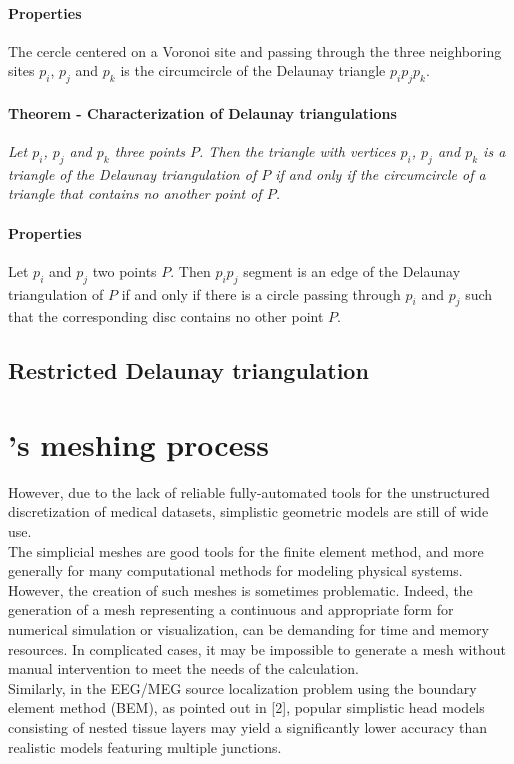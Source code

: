 \paragraph{Properties}
{
The cercle centered on a Voronoi site and passing through the three neighboring sites $p_{i}$, $p_{j}$ and $p_{k}$ is the circumcircle of the Delaunay triangle $p_{i}p_{j}p_{k}$.
}


\paragraph{Theorem - Characterization of Delaunay triangulations}
{
\it Let $p_{i}$, $p_{j}$ and $p_{k}$ three points $P$. Then the triangle with vertices $p_{i}$, $p_{j}$ and $p_{k}$ is a triangle of the Delaunay triangulation of $P$ if and only if the circumcircle of a triangle that contains no another point of $P$.
}

\paragraph{Properties}
{
Let $p_{i}$ and $p_{j}$ two points $P$. Then $p_{i}p_{j}$ segment is an edge of the Delaunay triangulation of $P$ if and only if there is a circle passing through $p_{i}$ and $p_{j}$ such that the corresponding disc contains no other point $P$.
}

\subsection{Restricted Delaunay triangulation}

\newpage{}


\section{\FIJEE{}'s meshing process}

However, due to the lack of reliable fully-automated tools for the unstructured discretization of medical datasets, simplistic geometric models are still of wide use. \\
The simplicial meshes are good tools for the finite element method, and more generally for many computational methods for modeling physical systems. However, the creation of such meshes is sometimes problematic. Indeed, the generation of a mesh representing a continuous and appropriate form for numerical simulation or visualization, can be demanding for time and memory resources. In complicated cases, it may be impossible to generate a mesh without manual intervention to meet the needs of the calculation.\\
Similarly, in the EEG/MEG source localization problem using the boundary element method (BEM), as pointed out in [2], popular simplistic head models consisting of nested tissue layers may yield a significantly lower accuracy than realistic models featuring multiple junctions.\\


